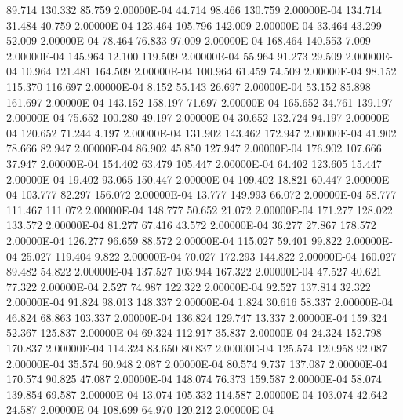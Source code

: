     89.714   130.332    85.759  2.00000E-04
    44.714    98.466   130.759  2.00000E-04
   134.714    31.484    40.759  2.00000E-04
   123.464   105.796   142.009  2.00000E-04
    33.464    43.299    52.009  2.00000E-04
    78.464    76.833    97.009  2.00000E-04
   168.464   140.553     7.009  2.00000E-04
   145.964    12.100   119.509  2.00000E-04
    55.964    91.273    29.509  2.00000E-04
    10.964   121.481   164.509  2.00000E-04
   100.964    61.459    74.509  2.00000E-04
    98.152   115.370   116.697  2.00000E-04
     8.152    55.143    26.697  2.00000E-04
    53.152    85.898   161.697  2.00000E-04
   143.152   158.197    71.697  2.00000E-04
   165.652    34.761   139.197  2.00000E-04
    75.652   100.280    49.197  2.00000E-04
    30.652   132.724    94.197  2.00000E-04
   120.652    71.244     4.197  2.00000E-04
   131.902   143.462   172.947  2.00000E-04
    41.902    78.666    82.947  2.00000E-04
    86.902    45.850   127.947  2.00000E-04
   176.902   107.666    37.947  2.00000E-04
   154.402    63.479   105.447  2.00000E-04
    64.402   123.605    15.447  2.00000E-04
    19.402    93.065   150.447  2.00000E-04
   109.402    18.821    60.447  2.00000E-04
   103.777    82.297   156.072  2.00000E-04
    13.777   149.993    66.072  2.00000E-04
    58.777   111.467   111.072  2.00000E-04
   148.777    50.652    21.072  2.00000E-04
   171.277   128.022   133.572  2.00000E-04
    81.277    67.416    43.572  2.00000E-04
    36.277    27.867   178.572  2.00000E-04
   126.277    96.659    88.572  2.00000E-04
   115.027    59.401    99.822  2.00000E-04
    25.027   119.404     9.822  2.00000E-04
    70.027   172.293   144.822  2.00000E-04
   160.027    89.482    54.822  2.00000E-04
   137.527   103.944   167.322  2.00000E-04
    47.527    40.621    77.322  2.00000E-04
     2.527    74.987   122.322  2.00000E-04
    92.527   137.814    32.322  2.00000E-04
    91.824    98.013   148.337  2.00000E-04
     1.824    30.616    58.337  2.00000E-04
    46.824    68.863   103.337  2.00000E-04
   136.824   129.747    13.337  2.00000E-04
   159.324    52.367   125.837  2.00000E-04
    69.324   112.917    35.837  2.00000E-04
    24.324   152.798   170.837  2.00000E-04
   114.324    83.650    80.837  2.00000E-04
   125.574   120.958    92.087  2.00000E-04
    35.574    60.948     2.087  2.00000E-04
    80.574     9.737   137.087  2.00000E-04
   170.574    90.825    47.087  2.00000E-04
   148.074    76.373   159.587  2.00000E-04
    58.074   139.854    69.587  2.00000E-04
    13.074   105.332   114.587  2.00000E-04
   103.074    42.642    24.587  2.00000E-04
   108.699    64.970   120.212  2.00000E-04
